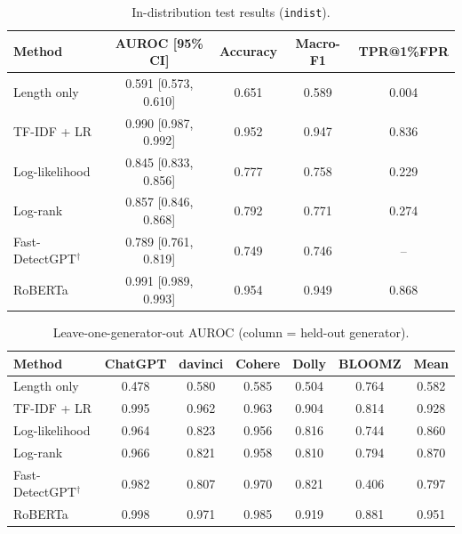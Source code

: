 \documentclass[11pt,a4paper]{article}
\begin{document}
\begin{table}
  \caption{In-distribution test results (\texttt{indist}).}
  \begin{tabular}{lcccc}
  \hline\hline
  Method & AUROC [95\% CI] & Accuracy & Macro-F1 & TPR@1\%FPR \\
  \hline
  Length only                & 0.591 [0.573, 0.610] & 0.651 & 0.589 & 0.004 \\
  TF-IDF + LR                & 0.990 [0.987, 0.992] & 0.952 & 0.947 & 0.836 \\
  Log-likelihood             & 0.845 [0.833, 0.856] & 0.777 & 0.758 & 0.229 \\
  Log-rank                   & 0.857 [0.846, 0.868] & 0.792 & 0.771 & 0.274 \\
  Fast-DetectGPT$^\dagger$   & 0.789 [0.761, 0.819] & 0.749 & 0.746 & -- \\
  RoBERTa                    & 0.991 [0.989, 0.993] & 0.954 & 0.949 & 0.868 \\
  \hline\hline
  \end{tabular}
  \label{tab:indist}
\end{table}

\begin{table}
  \caption{Leave-one-generator-out AUROC (column = held-out generator).}
  \begin{tabular}{lcccccc}
  \hline\hline
  Method & ChatGPT & davinci & Cohere & Dolly & BLOOMZ & Mean \\
  \hline
  Length only                & 0.478 & 0.580 & 0.585 & 0.504 & 0.764 & 0.582 \\
  TF-IDF + LR                & 0.995 & 0.962 & 0.963 & 0.904 & 0.814 & 0.928 \\
  Log-likelihood             & 0.964 & 0.823 & 0.956 & 0.816 & 0.744 & 0.860 \\
  Log-rank                   & 0.966 & 0.821 & 0.958 & 0.810 & 0.794 & 0.870 \\
  Fast-DetectGPT$^\dagger$   & 0.982 & 0.807 & 0.970 & 0.821 & 0.406 & 0.797 \\
  RoBERTa                    & 0.998 & 0.971 & 0.985 & 0.919 & 0.881 & 0.951 \\
  \hline\hline
  \end{tabular}
  \label{tab:logo}
\end{table}
\end{document}
